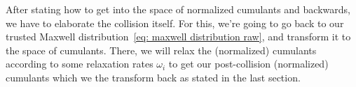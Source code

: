 
After stating how to get into the space of normalized cumulants and backwards, we have to elaborate the collision itself.
For this, we're going to go back to our trusted Maxwell distribution~\eqref{eq: maxwell distribution raw}, and transform it to the space of cumulants.
There, we will relax the (normalized) cumulants according to some relaxation rates $\omega_i$ to get our post-collision (normalized) cumulants which we the transform back as stated in the last section.
